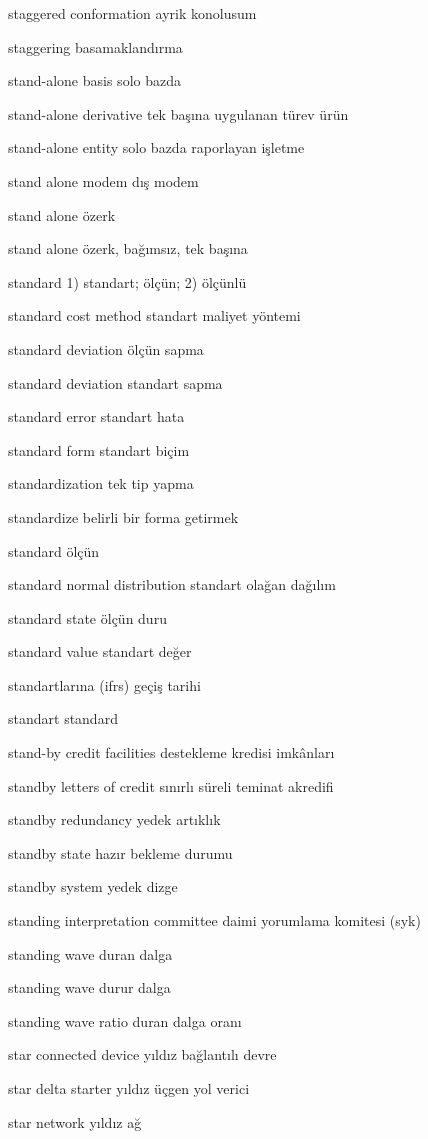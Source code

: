 \documentclass[12pt,fleqn]{article}\usepackage{../../common}
\begin{document}
staggered conformation ayrik konolusum

staggering basamaklandırma

stand-alone basis solo bazda

stand-alone derivative tek başına uygulanan türev ürün

stand-alone entity solo bazda raporlayan işletme

stand alone modem dış modem

stand alone özerk

stand alone özerk, bağımsız, tek başına

standard 1) standart; ölçün; 2) ölçünlü

standard cost method standart maliyet yöntemi

standard deviation ölçün sapma

standard deviation standart sapma

standard error standart hata

standard form standart biçim

standardization tek tip yapma

standardize belirli bir forma getirmek

standard ölçün

standard normal distribution standart olağan dağılım

standard state ölçün duru

standard value standart değer

standartlarına (ifrs) geçiş tarihi

standart standard

stand-by credit facilities destekleme kredisi imkânları

standby letters of credit sınırlı süreli teminat akredifi

standby redundancy yedek artıklık

standby state hazır bekleme durumu

standby system yedek dizge

standing interpretation committee daimi yorumlama komitesi (syk)

standing wave duran dalga

standing wave durur dalga

standing wave ratio duran dalga oranı

star connected device yıldız bağlantılı devre

star delta starter yıldız üçgen yol verici

star network yıldız ağ
\end{document}
